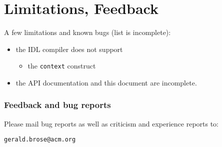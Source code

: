 \documentclass[12pt]{scrbook}
\begin{document}

\chapter{Limitations, Feedback}

A few limitations and known bugs (list is incomplete):

\begin{itemize}
    \item the IDL compiler does not support
    \begin{itemize}
        \item the {\tt context} construct
    \end{itemize}
    \item the API documentation and this document are incomplete.
\end{itemize}

\subsection*{Feedback and bug reports}

Please mail bug reports as well as criticism and experience reports to:

\verb+gerald.brose@acm.org+

{


}
\end{document}
